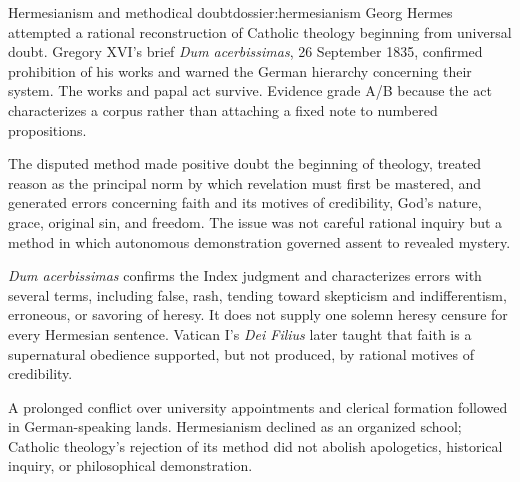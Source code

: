 \begin{heresydossier}{Hermesianism and methodical doubt}{dossier:hermesianism}
\objectfield Georg Hermes attempted a rational reconstruction of Catholic theology beginning from universal doubt. Gregory XVI's brief \emph{Dum acerbissimas}, 26 September 1835, confirmed prohibition of his works and warned the German hierarchy concerning their system. The works and papal act survive. Evidence grade A/B because the act characterizes a corpus rather than attaching a fixed note to numbered propositions.

\propositionfield The disputed method made positive doubt the beginning of theology, treated reason as the principal norm by which revelation must first be mastered, and generated errors concerning faith and its motives of credibility, God's nature, grace, original sin, and freedom. The issue was not careful rational inquiry but a method in which autonomous demonstration governed assent to revealed mystery.

\responsefield \emph{Dum acerbissimas} confirms the Index judgment and characterizes errors with several terms, including false, rash, tending toward skepticism and indifferentism, erroneous, or savoring of heresy. It does not supply one solemn heresy censure for every Hermesian sentence. Vatican I's \emph{Dei Filius} later taught that faith is a supernatural obedience supported, but not produced, by rational motives of credibility.

\aftermathfield A prolonged conflict over university appointments and clerical formation followed in German-speaking lands. Hermesianism declined as an organized school; Catholic theology's rejection of its method did not abolish apologetics, historical inquiry, or philosophical demonstration.
\end{heresydossier}

